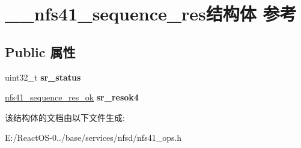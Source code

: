 \hypertarget{struct____nfs41__sequence__res}{}\section{\+\_\+\+\_\+nfs41\+\_\+sequence\+\_\+res结构体 参考}
\label{struct____nfs41__sequence__res}
\subsection*{Public 属性}
\begin{DoxyCompactItemize}
\item 
\mbox{\label{struct____nfs41__sequence__res_a532156be8820a9ab81dc96153acadd7d}} 
uint32\+\_\+t {\bfseries sr\+\_\+status}
\item 
\mbox{\label{struct____nfs41__sequence__res_adb56f150e8854adaaddf9bf0b27e211f}} 
\hyperlink{struct____nfs41__sequence__res__ok}{nfs41\+\_\+sequence\+\_\+res\+\_\+ok} {\bfseries sr\+\_\+resok4}
\end{DoxyCompactItemize}


该结构体的文档由以下文件生成\+:\begin{DoxyCompactItemize}
\item 
E\+:/\+React\+O\+S-\/0../base/services/nfsd/nfs41\+\_\+ops.\+h\end{DoxyCompactItemize}
